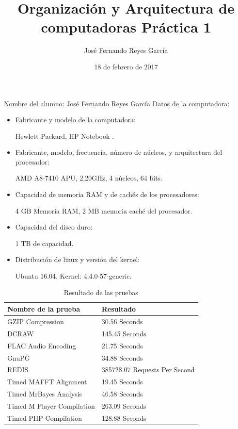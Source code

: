 \documentclass[12pt, letterpaper, twoside]{article}
\title{Organizaci\'on y Arquitectura de computadoras Práctica 1}
\author{José Fernando Reyes García}
\date{18 de febrero de 2017}
\begin{document}
\maketitle

Nombre del alumno: José Fernando Reyes García
Datos de la computadora:
\begin{itemize}
\item Fabricante y modelo de la computadora:
  
  Hewlett Packard, HP Notebook .
  
\item Fabricante, modelo, frecuencia, número de núcleos, y arquitectura del procesador:
  
  AMD A8-7410 APU, 2.20GHz, 4 núcleos, 64 bits.
  
\item Capacidad de memoria RAM y de cachés de los procesadores:
  
  4 GB Memoria RAM, 2 MB memoria caché del procesador.
    
\item Capacidad del disco duro:
  
  1 TB de capacidad.
  
\item Distribución de linux y versión del kernel:
  
  Ubuntu 16.04, Kernel: 4.4.0-57-generic. 
\end{itemize}

\begin{table}[H]
\begin{center}
\begin{tabular}{|l|l|}
\hline
Nombre de la prueba & Resultado \\
\hline \hline
GZIP Compression & 30.56 Seconds \\ \hline
DCRAW & 145.45 Seconds \\ \hline
FLAC Audio Encoding & 21.75 Seconds \\ \hline
GnuPG & 34.88 Seconds\\  \hline
REDIS & 385728.07 Requests Per Second \\ \hline
Timed MAFFT Alignment & 19.45 Seconds \\ \hline
Timed MrBayes Analysis & 46.58 Seconds \\ \hline
Timed M Player Compilation & 263.09 Seconds \\ \hline
Timed PHP Compilation & 128.88 Seconds\\ \hline
\end{tabular}
\caption{Resultado de las pruebas}
\label{tabla:sencilla}
\end{center}
\end{table}
\end{document}
